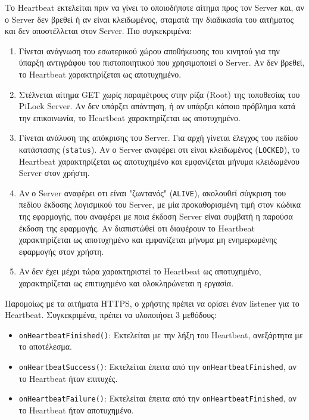 	Το Heartbeat εκτελείται πριν να γίνει το οποιοδήποτε αίτημα προς τον Server και, αν ο Server δεν βρεθεί ή αν είναι κλειδωμένος, σταματά την διαδικασία του αιτήματος και δεν αποστέλλεται στον Server. Πιο συγκεκριμένα:
	\begin{enumerate}
		\item Γίνεται ανάγνωση του εσωτερικού χώρου αποθήκευσης του κινητού για την ύπαρξη αντιγράφου του πιστοποιητικού που χρησιμοποιεί ο Server. Αν δεν βρεθεί, το Heartbeat χαρακτηρίζεται ως αποτυχημένο.
		\item Στέλνεται αίτημα GET χωρίς παραμέτρους στην ρίζα (Root) της τοποθεσίας του PiLock Server. Αν δεν υπάρξει απάντηση, ή αν υπάρξει κάποιο πρόβλημα κατά την επικοινωνία, το Heartbeat χαρακτηρίζεται ως αποτυχημένο.
		\item Γίνεται ανάλυση της απόκρισης του Server. Για αρχή γίνεται έλεγχος του πεδίου κατάστασης (\verb|status|). Αν ο Server αναφέρει οτι είναι κλειδωμένος (\verb|LOCKED|), το Heartbeat χαρακτηρίζεται ως αποτυχημένο και εμφανίζεται μήνυμα κλειδωμένου Server στον χρήστη. 
		\item Αν ο Server αναφέρει οτι είναι "ζωντανός" (\verb|ALIVE|), ακολουθεί σύγκριση του πεδίου έκδοσης λογισμικού του Server, με μία προκαθορισμένη τιμή στον κώδικα της εφαρμογής, που αναφέρει με ποια έκδοση Server είναι συμβατή η παρούσα έκδοση της εφαρμογής. Αν διαπιστώθεί οτι διαφέρουν το Heartbeat χαρακτηρίζεται ως αποτυχημένο και εμφανίζεται μήνυμα μη ενημερωμένης εφαρμογής στον χρήστη. 
		\item Αν δεν έχει μέχρι τώρα χαρακτηριστεί το Heartbeat ως αποτυχημένο, χαρακτηρίζεται ως επιτυχημένο και ολοκληρώνεται η εργασία.
	\end{enumerate}

	Παρομοίως με τα αιτήματα HTTPS, ο χρήστης πρέπει να ορίσει έναν listener για το Heartbeat. Συγκεκριμένα, πρέπει να υλοποιήσει 3 μεθόδους:

	\begin{itemize}
		\item \verb|onHeartbeatFinished()|: Εκτελείται με την λήξη του Heartbeat, ανεξάρτητα με το αποτέλεσμα.
		\item \verb|onHeartbeatSuccess()|: Εκτελείται έπειτα από την \verb|onHeartbeatFinished|, αν το Heartbeat ήταν επιτυχές.
		\item \verb|onHeartbeatFailure()|: Εκτελείται έπειτα από την \verb|onHeartbeatFinished|, αν το Heartbeat ήταν αποτυχημένο.
	\end{itemize}